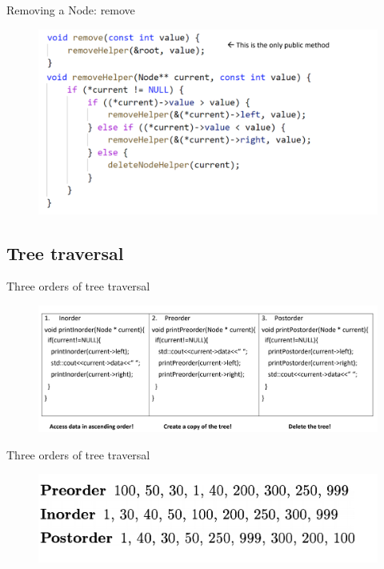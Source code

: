 \documentclass{beamer}
\begin{document}
\begin{frame}{Removing a Node: remove}
        \begin{figure}
            \includegraphics[width=\textwidth]{BST_remove.png}
    \end{figure}
\end{frame}

\subsection{Tree traversal}
\begin{frame}{Three orders of tree traversal}
        \begin{figure}
            \includegraphics[width=\textwidth]{BST_traverse.png}
    \end{figure}
\end{frame}

\begin{frame}{Three orders of tree traversal}
        \begin{figure}
            \includegraphics[width=\textwidth]{BST_order.png}
    \end{figure}
\end{frame}
\end{document}
